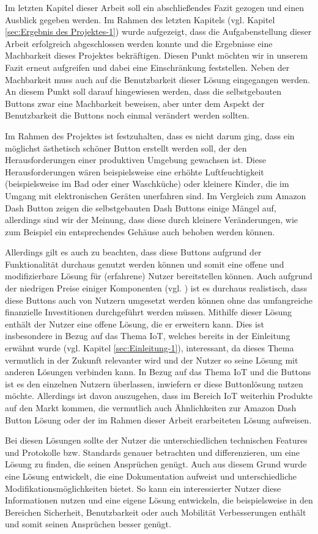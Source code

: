 Im letzten Kapitel dieser Arbeit soll ein abschließendes Fazit gezogen und einen Ausblick gegeben werden. Im Rahmen des letzten Kapitels (vgl. Kapitel \ref{sec:Ergebnis des Projektes-1}) wurde aufgezeigt, dass die Aufgabenstellung dieser Arbeit erfolgreich abgeschlossen werden konnte und die Ergebnisse eine Machbarkeit dieses Projektes bekräftigen. Diesen Punkt möchten wir in unserem Fazit erneut aufgreifen und dabei eine Einschränkung feststellen. Neben der Machbarkeit muss auch auf die Benutzbarkeit dieser Lösung eingegangen werden. An diesem Punkt soll  darauf hingewiesen werden, dass die selbstgebauten Buttons zwar eine Machbarkeit beweisen, aber unter dem Aspekt der Benutzbarkeit die Buttons noch einmal verändert werden sollten. 

Im Rahmen des Projektes ist festzuhalten, dass es nicht darum ging, dass ein möglichst ästhetisch schöner Button erstellt werden soll, der den Herausforderungen einer produktiven Umgebung gewachsen ist. Diese Herausforderungen wären beispielsweise eine erhöhte Luftfeuchtigkeit (beispielsweise im Bad oder einer Waschküche) oder kleinere Kinder, die im Umgang mit elektronischen Geräten unerfahren sind. Im Vergleich zum Amazon Dash Button zeigen die selbstgebauten Dash Buttons einige Mängel auf, allerdings sind wir der Meinung, dass diese durch kleinere Veränderungen, wie zum Beispiel ein entsprechendes Gehäuse auch behoben werden können. 

Allerdings gilt es auch zu beachten, dass diese Buttons aufgrund der Funktionalität durchaus genutzt werden können und somit eine offene und modifizierbare Lösung für (erfahrene) Nutzer bereitstellen können. Auch aufgrund der niedrigen Preise einiger Komponenten (vgl. \cite{.t}) ist es durchaus realistisch, dass diese Buttons auch von Nutzern umgesetzt werden können ohne das umfangreiche finanzielle Investitionen durchgeführt werden müssen. 
Mithilfe dieser Lösung enthält der Nutzer eine offene Lösung, die er erweitern kann. Dies ist insbesondere in Bezug auf das Thema \ac{IoT}, welches bereits in der Einleitung erwähnt wurde (vgl. Kapitel \ref{sec:Einleitung-1}), interessant, da dieses Thema vermutlich in der Zukunft relevanter wird und der Nutzer so seine Lösung mit anderen Lösungen verbinden kann. In Bezug auf das Thema \ac{IoT} und die Buttons ist es den einzelnen Nutzern überlassen, inwiefern er diese Buttonlösung nutzen möchte. Allerdings ist davon auszugehen, dass im Bereich \ac{IoT} weiterhin Produkte auf den Markt kommen, die vermutlich auch Ähnlichkeiten zur Amazon Dash Button Lösung oder der im Rahmen dieser Arbeit erarbeiteten Lösung aufweisen. 

Bei diesen Lösungen sollte der Nutzer die unterschiedlichen technischen Features und Protokolle bzw. Standards genauer betrachten und differenzieren, um eine Lösung zu finden, die seinen Ansprüchen genügt. 
Auch aus diesem Grund wurde eine Lösung entwickelt, die eine Dokumentation aufweist und unterschiedliche Modifikationsmöglichkeiten bietet. So kann ein interessierter Nutzer diese Informationen nutzen und eine eigene Lösung entwickeln, die beispielsweise in den Bereichen Sicherheit, Benutzbarkeit oder auch Mobilität Verbesserungen enthält und somit seinen Ansprüchen besser genügt. 